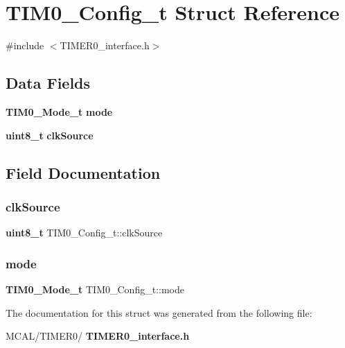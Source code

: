 \section{T\+I\+M0\+\_\+\+Config\+\_\+t Struct Reference}
\label{struct_t_i_m0___config__t}


{\ttfamily \#include $<$T\+I\+M\+E\+R0\+\_\+interface.\+h$>$}

\subsection*{Data Fields}
\begin{DoxyCompactItemize}
\item 
\textbf{ T\+I\+M0\+\_\+\+Mode\+\_\+t} \textbf{ mode}
\item 
\textbf{ uint8\+\_\+t} \textbf{ clk\+Source}
\end{DoxyCompactItemize}


\subsection{Field Documentation}
\mbox{\label{struct_t_i_m0___config__t_a80e52cf145be56ef34899d8a12a21cc9}} 
\subsubsection{clk\+Source}
{\footnotesize\ttfamily \textbf{ uint8\+\_\+t} T\+I\+M0\+\_\+\+Config\+\_\+t\+::clk\+Source}

\mbox{\label{struct_t_i_m0___config__t_ab1c32336a020d75f4e684eb265b0824d}} 
\subsubsection{mode}
{\footnotesize\ttfamily \textbf{ T\+I\+M0\+\_\+\+Mode\+\_\+t} T\+I\+M0\+\_\+\+Config\+\_\+t\+::mode}



The documentation for this struct was generated from the following file\+:\begin{DoxyCompactItemize}
\item 
M\+C\+A\+L/\+T\+I\+M\+E\+R0/\textbf{ T\+I\+M\+E\+R0\+\_\+interface.\+h}\end{DoxyCompactItemize}
